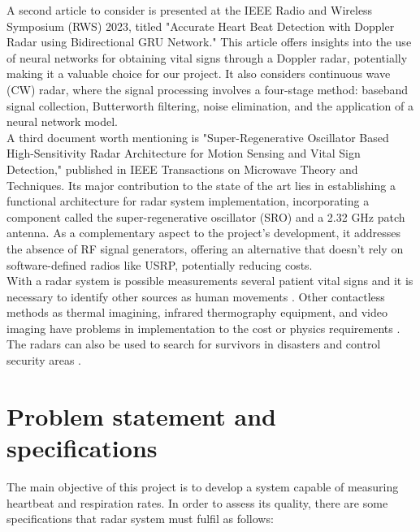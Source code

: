 \documentclass[lettersize,journal]{IEEEtran}
\begin{document}
A second article to consider is presented at the IEEE Radio and Wireless Symposium (RWS) 2023, titled "Accurate Heart Beat Detection with Doppler Radar using Bidirectional GRU Network." This article offers insights into the use of neural networks for obtaining vital signs through a Doppler radar, potentially making it a valuable choice for our project. It also considers continuous wave (CW) radar, where the signal processing involves a four-stage method: baseband signal collection, Butterworth filtering, noise elimination, and the application of a neural network model.\\


A third document worth mentioning is "Super-Regenerative Oscillator Based High-Sensitivity Radar Architecture for Motion Sensing and Vital Sign Detection," published in IEEE Transactions on Microwave Theory and Techniques. Its major contribution to the state of the art lies in establishing a functional architecture for radar system implementation, incorporating a component called the super-regenerative oscillator (SRO) and a 2.32 GHz patch antenna. As a complementary aspect to the project's development, it addresses the absence of RF signal generators, offering an alternative that doesn't rely on software-defined radios like USRP, potentially reducing costs.\\

With a radar system is possible measurements several patient vital signs and it is necessary to identify other sources as human movements \cite{f.kraiemDopplerRadarArchitecture2019}. Other contactless methods as thermal imagining, infrared thermography equipment, and video imaging have problems in implementation to the cost or physics requirements \cite{f.kraiemDopplerRadarArchitecture2019}. The radars can also be used to search for survivors in disasters and control security areas \cite{f.kraiemDopplerRadarArchitecture2019}.        



\section{Problem statement and specifications}

The main objective of this project is to develop a system capable of measuring heartbeat and respiration rates. In order to assess its quality, there are some specifications that radar system must fulfil as follows:
\end{document}
